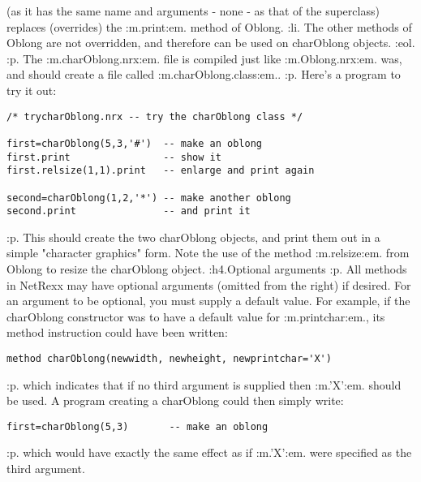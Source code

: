(as it has the same name and arguments - none - as that of the
superclass) replaces (overrides) the :m.print:em. method of Oblong.
:li.
The other methods of Oblong are not overridden, and therefore can
be used on charOblong objects.
:eol.
:p.
The :m.charOblong.nrx:em. file is compiled just
like :m.Oblong.nrx:em. was, and should create a file
called :m.charOblong.class:em..
:p.
Here's a program to try it out:
\begin{verbatim}
/* trycharOblong.nrx -- try the charOblong class */

first=charOblong(5,3,'#')  -- make an oblong
first.print                -- show it
first.relsize(1,1).print   -- enlarge and print again

second=charOblong(1,2,'*') -- make another oblong
second.print               -- and print it
\end{verbatim}
:p.
This should create the two charOblong objects, and print them out in a
simple "character graphics" form.
Note the use of the method :m.relsize:em. from Oblong to resize
the charOblong object.
:h4.Optional arguments
:p.
All methods in NetRexx may have optional arguments (omitted from the
right) if desired.  For an argument to be optional, you must supply a
default value.  For example, if the charOblong constructor was to have a
default value for :m.printchar:em., its method instruction could
have been written:
\begin{verbatim}
method charOblong(newwidth, newheight, newprintchar='X')
\end{verbatim}
:p.
which indicates that if no third argument is supplied
then :m.'X':em. should be used.  A program creating a charOblong
could then simply write:
\begin{verbatim}
first=charOblong(5,3)       -- make an oblong
\end{verbatim}
:p.
which would have exactly the same effect as if :m.'X':em. were
specified as the third argument.
